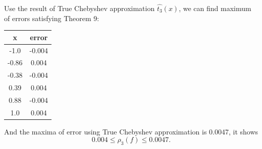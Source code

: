 {Use the result of True Chebyshev approximation $\hat{t_3}(x)$, we can find maximum of errors satisfying Theorem 9: \\
\begin{tabular}{|c|c|}
\hline
x & error \\
\hline
-1.0 & -0.004 \\
\hline
-0.86 & 0.004 \\
\hline
-0.38 & -0.004 \\
\hline
0.39 & 0.004 \\
\hline
0.88 & -0.004 \\
\hline
1.0 & 0.004 \\
\hline
\end{tabular}

And the maxima of error using True Chebyshev approximation is 0.0047, it shows
$$
0.004 \le \rho_3(f) \le 0.0047.
$$
}

